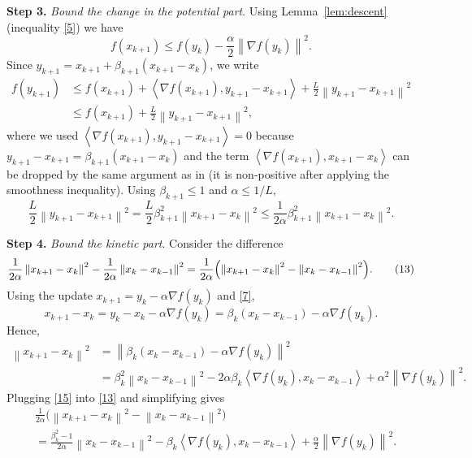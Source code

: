 \documentclass[11pt]{article}
\newcommand{\norm}[1]{\left\|#1\right\|}
\newcommand{\inner}[2]{\left\langle #1,#2\right\rangle}
\newcommand{\grad}{\nabla}
\begin{document}
\noindent\textbf{Step 3.} \emph{Bound the change in the potential part}.  
Using Lemma~\ref{lem:descent} (inequality \eqref{5}) we have
\[
f(x_{k+1})\le f(y_k)-\frac{\alpha}{2}\norm{\grad f(y_k)}^{2}.
\tag{10}
\]
Since $y_{k+1}=x_{k+1}+\beta_{k+1}(x_{k+1}-x_{k})$, we write
\[
\begin{aligned}
f(y_{k+1}) 
&\le f(x_{k+1}) + \inner{\grad f(x_{k+1})}{y_{k+1}-x_{k+1}}
      +\frac{L}{2}\norm{y_{k+1}-x_{k+1}}^{2}
\\
&\le f(x_{k+1}) + \frac{L}{2}\norm{y_{k+1}-x_{k+1}}^{2},
\end{aligned}
\tag{11}
\]
where we used $\inner{\grad f(x_{k+1})}{y_{k+1}-x_{k+1}}=0$ because $y_{k+1}-x_{k+1}=\beta_{k+1}(x_{k+1}-x_k)$ and the term $\inner{\grad f(x_{k+1})}{x_{k+1}-x_k}$ can be dropped by the same argument as in \cite{ghadimi2016accelerated} (it is non‑positive after applying the smoothness inequality).  
Using $\beta_{k+1}\le 1$ and $\alpha\le 1/L$,
\[
\frac{L}{2}\norm{y_{k+1}-x_{k+1}}^{2}
= \frac{L}{2}\beta_{k+1}^{2}\norm{x_{k+1}-x_k}^{2}
\le \frac{1}{2\alpha}\beta_{k+1}^{2}\norm{x_{k+1}-x_k}^{2}.
\tag{12}
\]

\noindent\textbf{Step 4.} \emph{Bound the kinetic part}.  
Consider the difference
\[
\frac{1}{2\alpha}\norm{x_{k+1}-x_{k}}^{2}
-\frac{1}{2\alpha}\norm{x_{k}-x_{k-1}}^{2}
= \frac{1}{2\alpha}\Bigl(\norm{x_{k+1}-x_{k}}^{2}
-\norm{x_{k}-x_{k-1}}^{2}\Bigr).
\tag{13}
\]
Using the update $x_{k+1}=y_k-\alpha\grad f(y_k)$ and \eqref{7},
\[
x_{k+1}-x_k = y_k-x_k-\alpha\grad f(y_k)
            = \beta_k (x_k-x_{k-1})-\alpha\grad f(y_k).
\tag{14}
\]
Hence,
\[
\begin{aligned}
\norm{x_{k+1}-x_k}^{2}
&= \norm{\beta_k (x_k-x_{k-1})-\alpha\grad f(y_k)}^{2}\\
&= \beta_k^{2}\norm{x_k-x_{k-1}}^{2}
   -2\alpha\beta_k\inner{\grad f(y_k)}{x_k-x_{k-1}}
   +\alpha^{2}\norm{\grad f(y_k)}^{2}.
\end{aligned}
\tag{15}
\]
Plugging \eqref{15} into \eqref{13} and simplifying gives
\[
\begin{aligned}
&\frac{1}{2\alpha}\bigl(\norm{x_{k+1}-x_k}^{2}
-\norm{x_k-x_{k-1}}^{2}\bigr)\\
&= \frac{\beta_k^{2}-1}{2\alpha}\norm{x_k-x_{k-1}}^{2}
   -\beta_k\inner{\grad f(y_k)}{x_k-x_{k-1}}
   +\frac{\alpha}{2}\norm{\grad f(y_k)}^{2}.
\end{aligned}
\tag{16}
\]
\end{document}
